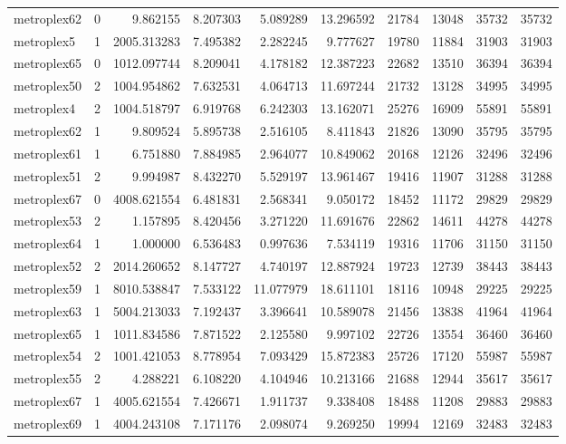 \begin{longtable}{|l|r|r|r|r|r|r|r|r|r|}
metroplex62 & 0 & 9.862155 & 8.207303 & 5.089289 & 13.296592 & 21784 & 13048 & 35732 & 35732 \\
metroplex5 & 1 & 2005.313283 & 7.495382 & 2.282245 & 9.777627 & 19780 & 11884 & 31903 & 31903 \\
metroplex65 & 0 & 1012.097744 & 8.209041 & 4.178182 & 12.387223 & 22682 & 13510 & 36394 & 36394 \\
metroplex50 & 2 & 1004.954862 & 7.632531 & 4.064713 & 11.697244 & 21732 & 13128 & 34995 & 34995 \\
metroplex4 & 2 & 1004.518797 & 6.919768 & 6.242303 & 13.162071 & 25276 & 16909 & 55891 & 55891 \\
metroplex62 & 1 & 9.809524 & 5.895738 & 2.516105 & 8.411843 & 21826 & 13090 & 35795 & 35795 \\
metroplex61 & 1 & 6.751880 & 7.884985 & 2.964077 & 10.849062 & 20168 & 12126 & 32496 & 32496 \\
metroplex51 & 2 & 9.994987 & 8.432270 & 5.529197 & 13.961467 & 19416 & 11907 & 31288 & 31288 \\
metroplex67 & 0 & 4008.621554 & 6.481831 & 2.568341 & 9.050172 & 18452 & 11172 & 29829 & 29829 \\
metroplex53 & 2 & 1.157895 & 8.420456 & 3.271220 & 11.691676 & 22862 & 14611 & 44278 & 44278 \\
metroplex64 & 1 & 1.000000 & 6.536483 & 0.997636 & 7.534119 & 19316 & 11706 & 31150 & 31150 \\
metroplex52 & 2 & 2014.260652 & 8.147727 & 4.740197 & 12.887924 & 19723 & 12739 & 38443 & 38443 \\
metroplex59 & 1 & 8010.538847 & 7.533122 & 11.077979 & 18.611101 & 18116 & 10948 & 29225 & 29225 \\
metroplex63 & 1 & 5004.213033 & 7.192437 & 3.396641 & 10.589078 & 21456 & 13838 & 41964 & 41964 \\
metroplex65 & 1 & 1011.834586 & 7.871522 & 2.125580 & 9.997102 & 22726 & 13554 & 36460 & 36460 \\
metroplex54 & 2 & 1001.421053 & 8.778954 & 7.093429 & 15.872383 & 25726 & 17120 & 55987 & 55987 \\
metroplex55 & 2 & 4.288221 & 6.108220 & 4.104946 & 10.213166 & 21688 & 12944 & 35617 & 35617 \\
metroplex67 & 1 & 4005.621554 & 7.426671 & 1.911737 & 9.338408 & 18488 & 11208 & 29883 & 29883 \\
metroplex69 & 1 & 4004.243108 & 7.171176 & 2.098074 & 9.269250 & 19994 & 12169 & 32483 & 32483 \\

\end{longtable}
